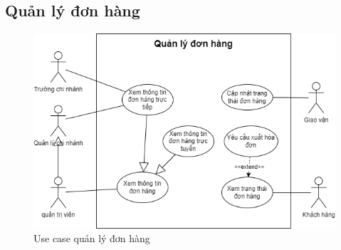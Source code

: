\newpage

\subsection{Quản lý đơn hàng}
\begin{figure}[!htp]
    \centering
    \includegraphics[width=5in]{img/UseCase/UseCase-Quản lý đơn hàng.drawio.png}
    \newline
    \caption{Use case quản lý đơn hàng}
\end{figure}

